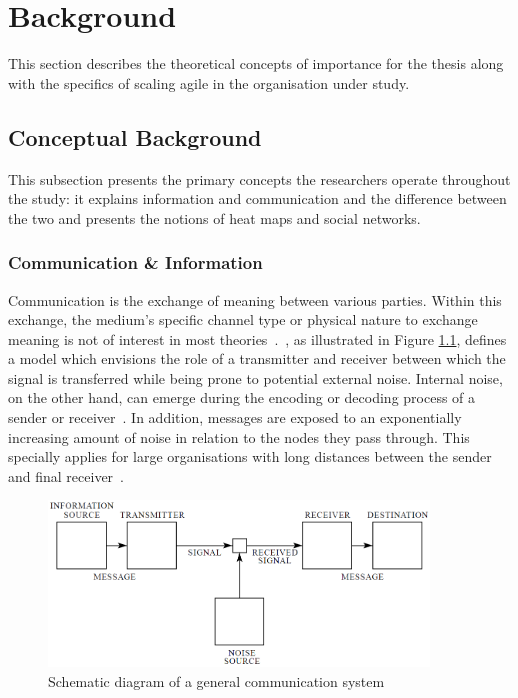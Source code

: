 \chapter{Background}
\label{chap:background}

This section describes the theoretical concepts of importance for the thesis along with the specifics of scaling agile in the organisation under study.

\section{Conceptual Background}

This subsection presents the primary concepts the researchers operate throughout the study: it explains information and communication and the difference between the two and presents the notions of heat maps and social networks.

\subsection{Communication \& Information}
\label{chap:background-comm-info}

Communication is the exchange of meaning between various parties. Within this exchange, the medium's specific channel type or physical nature to exchange meaning is not of interest in most theories~\citep{savage2011informationtheory}.~\citet{shannon1948theoryofcommunication}, as illustrated in Figure \ref{fig:communication-system}, defines a model which envisions the role of a transmitter and receiver between which the signal is transferred while being prone to potential external noise. Internal noise, on the other hand, can emerge during the encoding or decoding process of a sender or receiver~\citep{verdu1998informationtheory}.
In addition, messages are exposed to an exponentially increasing amount of noise in relation to the nodes they pass through. This specially applies for large organisations with long distances between the sender and final receiver~\citep{shannon1948theoryofcommunication}.

\begin{figure}[h!]
  \centering
  \includegraphics[width=0.90\textwidth]{figures/communication-information-shannon.png}
  \caption{Schematic diagram of a general communication system~\citep{shannon1948theoryofcommunication}}
  \label{fig:communication-system}
\end{figure}


